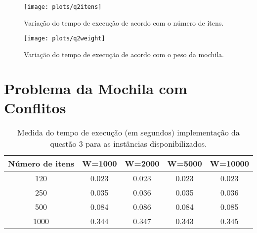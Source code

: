 \documentclass[a4paper]{article}
\begin{document}
\begin{figure}[H]
\centering
\texttt{[image: plots/q2itens]}
\caption{Variação do tempo de execução de acordo com o número de itens.}
\label{fig:q2:itens}
\end{figure}

\begin{figure}[H]
\centering
\texttt{[image: plots/q2weight]}
\caption{Variação do tempo de execução de acordo com o peso da mochila.}
\label{fig:q2:weight}
\end{figure}

\section{Problema da Mochila com Conflitos}

\begin{table}[H]
\centering
\begin{tabular}{c|c|c|c|c}
Número de itens & W=1000 & W=2000 & W=5000 & W=10000 \\
\hline
120 & 0.023	& 0.023	& 0.023	& 0.023	\\
250 & 0.035	& 0.036	& 0.035	& 0.036	\\
500 & 0.084	& 0.086	& 0.084	& 0.085	\\
1000 & 0.344	& 0.347	& 0.343	& 0.345	\\
\end{tabular}
\caption{Medida do tempo de execução (em segundos) implementação da questão 3 para as instâncias disponibilizados.}
\label{tab:q3:bench}
\end{table}
\end{document}

